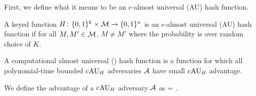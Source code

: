 First, we define what it means to be an $\epsilon$-almost universal (AU) hash function.

A keyed function $H{{\kern .05em}\colon{\kern .05em}}\{0,1\}^k\times{\cal M}\rightarrow\{0,1\}^n$ is
an $\epsilon$-almost universal (AU) hash function  if for all $M,M'\in{\cal M}$, $M \ne M'$
\bnm
   \le \epsilon
\enm
where the probability is over random choice of $K$.

A computational almost universal (\cAU) hash function is a function for which all polynomial-time bounded $\textnormal{cAU}_H$ adversaries ${\mathcal A}$ have small $\textnormal{cAU}_H$ advantage.
\begin{figure}[h]
\centering
{}
\end{figure}

We define the advantage of a $\textnormal{cAU}_H$ adversary ${\mathcal A}$ as
\bnm
   = \;.
\enm
{}

